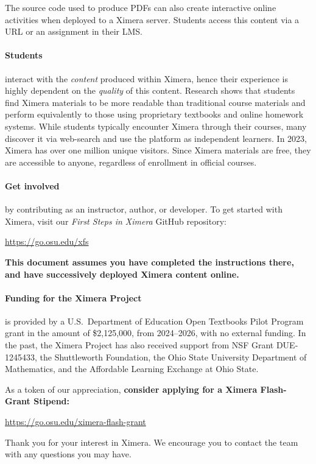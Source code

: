 \documentclass{ximera}
\begin{document}
The source code used to produce PDFs can also create interactive online
activities when deployed to a Ximera server. Students access this content via a
URL or an assignment in their LMS.


\paragraph{Students} interact with the \textit{content} produced within
Ximera, hence their experience is highly dependent on the \textit{quality} of this
content. Research shows that students find Ximera materials to be more readable
than traditional course materials and perform equivalently to those using
proprietary textbooks and online homework systems. While students typically
encounter Ximera through their courses, many discover it via web-search and
use the platform as independent learners. In 2023, Ximera has over one million
unique visitors. Since Ximera materials are free, they are accessible to
anyone, regardless of enrollment in official courses.




\paragraph{Get involved} by contributing as an instructor, author,
or developer. To get started with Ximera, visit our
\textit{First Steps in Ximera} GitHub repository:
\begin{center}
    \small\url{https://go.osu.edu/xfs}
\end{center}
\textbf{This document assumes you have completed the instructions there, and
    have
    successively deployed Ximera content online.}

\paragraph{Funding for the Ximera Project} is provided by
a U.S.\ Department of Education Open Textbooks Pilot Program grant in the
amount of \$2,125,000, from 2024--2026, with no external funding.
In the past, the Ximera Project has
also received support from NSF Grant DUE-1245433, the Shuttleworth
Foundation, the Ohio State University
Department of Mathematics, and the Affordable Learning Exchange at Ohio State.

As a token of our appreciation, \textbf{consider applying for a Ximera
    Flash-Grant Stipend:}
\begin{center}
    \small\url{https://go.osu.edu/ximera-flash-grant}
\end{center}
Thank you for your interest in Ximera. We encourage you to contact the
team with any questions you may have.
\end{document}
